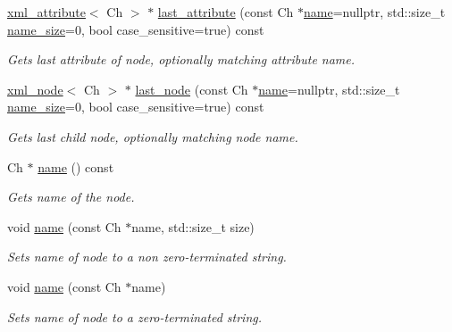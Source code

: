 \begin{DoxyCompactItemize}
\mbox{\hyperlink{classrapidxml_1_1xml__attribute}{xml\+\_\+attribute}}$<$ Ch $>$ $\ast$ \mbox{\hyperlink{classrapidxml_1_1xml__node_aac6275f8fc7ce79f9a7732240cf1428c}{last\+\_\+attribute}} (const Ch $\ast$\mbox{\hyperlink{classrapidxml_1_1xml__base_af8436e9ee14c127220113eaa956eafee}{name}}=nullptr, std\+::size\+\_\+t \mbox{\hyperlink{classrapidxml_1_1xml__base_ad01e2eff02202b130baad012d1ed7328}{name\+\_\+size}}=0, bool case\+\_\+sensitive=true) const
\begin{DoxyCompactList}\small\item\em Gets last attribute of node, optionally matching attribute name. \end{DoxyCompactList}\item 
\mbox{\hyperlink{classrapidxml_1_1xml__node}{xml\+\_\+node}}$<$ Ch $>$ $\ast$ \mbox{\hyperlink{classrapidxml_1_1xml__node_a139688bfa43885a5a87b018adaa66618}{last\+\_\+node}} (const Ch $\ast$\mbox{\hyperlink{classrapidxml_1_1xml__base_af8436e9ee14c127220113eaa956eafee}{name}}=nullptr, std\+::size\+\_\+t \mbox{\hyperlink{classrapidxml_1_1xml__base_ad01e2eff02202b130baad012d1ed7328}{name\+\_\+size}}=0, bool case\+\_\+sensitive=true) const
\begin{DoxyCompactList}\small\item\em Gets last child node, optionally matching node name. \end{DoxyCompactList}\item 
Ch $\ast$ \mbox{\hyperlink{classrapidxml_1_1xml__base_af8436e9ee14c127220113eaa956eafee}{name}} () const
\begin{DoxyCompactList}\small\item\em Gets name of the node. \end{DoxyCompactList}\item 
void \mbox{\hyperlink{classrapidxml_1_1xml__base_a4e7e23d06d48126c65b1f6266acfba5c}{name}} (const Ch $\ast$name, std\+::size\+\_\+t size)
\begin{DoxyCompactList}\small\item\em Sets name of node to a non zero-\/terminated string. \end{DoxyCompactList}\item 
void \mbox{\hyperlink{classrapidxml_1_1xml__base_ae099c291e104a0d277307fe71f5e0f9e}{name}} (const Ch $\ast$name)
\begin{DoxyCompactList}\small\item\em Sets name of node to a zero-\/terminated string. \end{DoxyCompactList}\item 

\end{DoxyCompactItemize}
